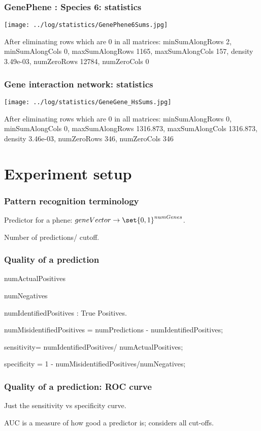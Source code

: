 \documentclass{beamer}
\begin{document}
\begin{frame}
\frametitle{GenePhene : Species 6: statistics}
\texttt{[image: ../log/statistics/GenePhene6Sums.jpg]}

After eliminating rows which are 0 in all matrices:
minSumAlongRows 2, minSumAlongCols 0, maxSumAlongRows 1165, maxSumAlongCols 157, density 3.49e-03, numZeroRows 12784, numZeroCols 0
\end{frame}


\begin{frame}
\frametitle{Gene interaction network: statistics}
\texttt{[image: ../log/statistics/GeneGene\_HsSums.jpg]}

After eliminating rows which are 0 in all matrices:
minSumAlongRows 0, minSumAlongCols 0, maxSumAlongRows 1316.873, maxSumAlongCols 1316.873, density 3.46e-03, numZeroRows 346, numZeroCols 346
\end{frame}

\section{Experiment setup}
\begin{frame}
\frametitle{Pattern recognition terminology}

Predictor for a phene: $geneVector \to \set{0, 1}^{numGenes}$.

Number of predictions/ cutoff.
\end{frame}

\begin{frame}
\frametitle{Quality of a prediction}
numActualPositives

numNegatives

numIdentifiedPositives : True Positives.

numMisidentifiedPositives = numPredictions - numIdentifiedPositives;

sensitivity= numIdentifiedPositives/ numActualPositives; 

specificity = 1 - numMisidentifiedPositives/numNegatives;

\end{frame}

\begin{frame}
\frametitle{Quality of a prediction: ROC curve}
Just the sensitivity vs specificity curve.

AUC is a measure of how good a predictor is; considers all cut-offs.
\end{frame}
\end{document}

